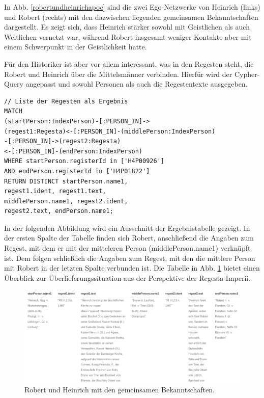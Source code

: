 \documentclass[ngerman,]{scrreprt}
\begin{document}
In Abb. \ref{robertundheinrichapoc} sind die zwei Ego-Netzwerke von Heinrich (links) und Robert (rechts) mit den dazwischen liegenden gemeinsamen Bekanntschaften dargestellt. Es zeigt sich, dass Heinrich stärker sowohl mit Geistlichen als auch Weltlichen vernetzt war, während Robert insgesamt weniger Kontakte aber mit einem Schwerpunkt in der Geistlichkeit hatte.

Für den Historiker ist aber vor allem interessant, was in den Regesten steht, die Robert und Heinrich über die Mittelsmänner verbinden. Hierfür wird der Cypher-Query angepasst und sowohl Personen als auch die Regestentexte ausgegeben.

\begin{verbatim}
// Liste der Regesten als Ergebnis
MATCH
(startPerson:IndexPerson)-[:PERSON_IN]->
(regest1:Regesta)<-[:PERSON_IN]-(middlePerson:IndexPerson)
-[:PERSON_IN]->(regest2:Regesta)
<-[:PERSON_IN]-(endPerson:IndexPerson)
WHERE startPerson.registerId in ['H4P00926']
AND endPerson.registerId in ['H4P01822']
RETURN DISTINCT startPerson.name1,
regest1.ident, regest1.text,
middlePerson.name1, regest2.ident,
regest2.text, endPerson.name1;
\end{verbatim}

In der folgenden Abbildung wird ein Ausschnitt der Ergebnistabelle gezeigt. In der ersten Spalte der Tabelle finden sich Robert, anschließend die Angaben zum Regest, mit dem er mit der mitteleren Person (middlePerson.name1) verknüpft ist. Dem folgen schließlich die Angaben zum Regest, mit den die mittlere Person mit Robert in der letzten Spalte verbunden ist. Die Tabelle in Abb. \ref{robertheinrichtabelle} bietet einen Überblick zur Überlieferungssituation aus der Perspektive der Regesta Imperii.

\begin{figure}
\centering
\includegraphics{Bilder/RI2Graph/RobertHeinrichApocTabelle.png}
\caption{Robert und Heinrich mit den gemeinsamen Bekanntschaften.}
\label{robertheinrichtabelle}
\end{figure}
\end{document}
